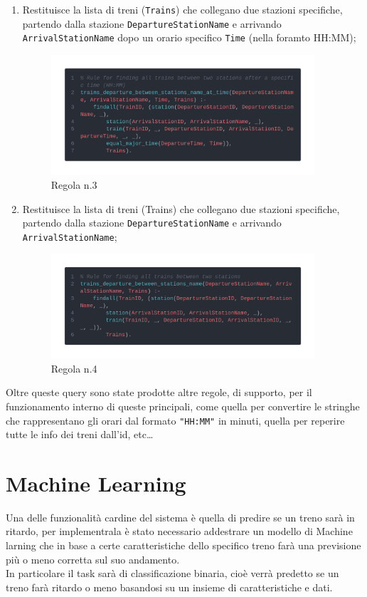 \documentclass[italian,12pt,a4paper]{article}
\begin{document}
\begin{enumerate}
\begin{figure}[h]
			\end{figure}
			\newpage
		\item Restituisce la lista di treni (\texttt{Trains}) che collegano due stazioni specifiche, partendo dalla stazione \texttt{DepartureStationName} e arrivando \texttt{ArrivalStationName} dopo un orario specifico \texttt{Time} (nella foramto HH:MM);
			\begin{figure}[h]
				\centering
				\includegraphics[width=370px]{img/code4}
				\caption{Regola n.3}

			\end{figure}
		\item Restituisce la lista di treni (Trains) che collegano due stazioni specifiche, partendo dalla stazione \texttt{DepartureStationName} e arrivando \texttt{ArrivalStationName};
			\begin{figure}[h]
				\centering
				\includegraphics[width=370px]{img/code3}
				\caption{Regola n.4}

			\end{figure}

				
	\end{enumerate}
	
	
	Oltre queste query sono state prodotte altre regole, di supporto, per il funzionamento interno di queste principali, come quella per convertire le stringhe che rappresentano gli orari dal formato \texttt{"HH:MM"} in minuti, quella per reperire tutte le info dei treni dall'id, etc\dots

	\section{Machine Learning}
		Una delle funzionalità cardine del sistema è quella di predire se un treno sarà in ritardo, per implementrala è stato necessario addestrare un modello di Machine larning che in base a certe caratteristiche dello specifico treno farà una previsione più o meno corretta sul suo andamento. \\
		\linebreak
		In particolare il task sarà di classificazione binaria, cioè verrà predetto se un treno farà ritardo o meno basandosi su un insieme di caratteristiche e dati.
	
\end{document}
